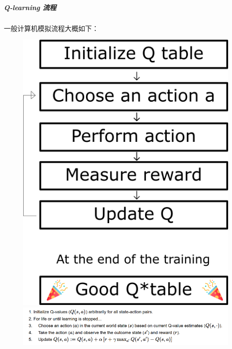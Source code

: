 \documentclass[UTF8,a4paper,12pt]{ctexbook}
\begin{document}
				\subparagraph{Q-learning 流程}
					一般计算机模拟流程大概如下：
					
					\begin{figure}[H]
						\centering
						\includegraphics[width=.4\linewidth]{qFuncProcess}
						\includegraphics[width=\linewidth]{qFuncProcess2}
					\end{figure}
				
\end{document}
